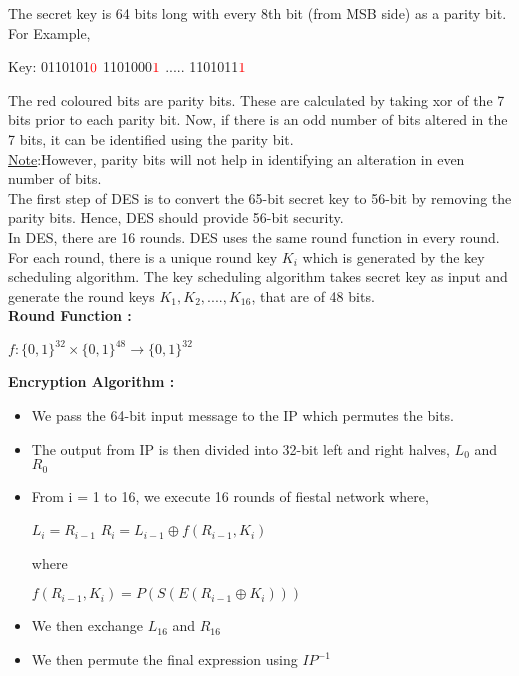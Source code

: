 \documentclass[11pt]{article}
\begin{document}
The secret key is 64 bits long with every 8th bit (from MSB side) as a parity bit. For Example, 
\begin{center}
    Key: 0110101$\textcolor{red}{0}$ 1101000$\textcolor{red}{1}$ ..... 1101011$\textcolor{red}{1}$
\end{center}
The red coloured bits are parity bits. These are calculated by taking xor of the 7 bits prior to each parity bit. Now, if there is an odd number of bits altered in the 7 bits, it can be identified using the parity bit.\\
\underline{Note}:However, parity bits will not help in identifying an alteration in even number of bits.\\
\vspace{3mm}
The first step of DES is to convert the 65-bit secret key to 56-bit by removing the parity bits. Hence, DES should provide 56-bit security.\\
In DES, there are 16 rounds. DES uses the same round function in every round. For each round, there is a unique round key $K_i$ which is generated by the key scheduling algorithm. The key scheduling algorithm takes secret key as input and generate the round keys $K_1, K_2, ...., K_{16}$, that are of 48 bits.\\
\vspace{3mm}
\textbf{Round Function :}
\begin{center}
    $f: \{0,1\}^{32} \times \{0,1\}^{48} \rightarrow \{0,1\}^{32}$
\end{center}
\textbf{Encryption Algorithm :}\\
\begin{itemize}
    \item We pass the 64-bit input message to the IP which permutes the bits.
    \item The output from IP is then divided into 32-bit left and right halves, $L_0$ and $R_0$
    \item From i = 1 to 16, we execute 16 rounds of fiestal network where,
    \begin{center}
        $L_i = R_{i-1}$
        $R_i = L_{i-1} \oplus f(R_{i-1}, K_i)$
    \end{center}
    where
    \begin{center}
        $f(R_{i-1}, K_i) = P(S(E(R_{i-1} \oplus K_i)))$
    \end{center}
    \item We then exchange $L_{16} $ and $R_{16}$
    \item We then permute the final expression using $IP^{-1}$
\end{itemize}
\end{document}
